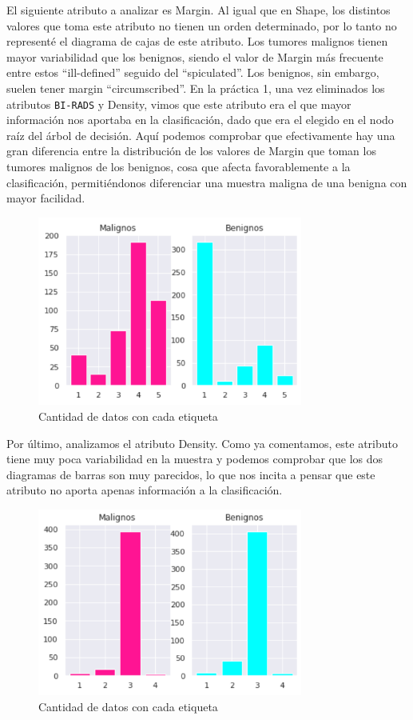 \documentclass[a4]{article}
\begin{document}
El siguiente atributo a analizar es Margin. Al igual que en Shape, los distintos valores que toma este atributo no tienen un orden determinado, por lo tanto no representé el diagrama de cajas de este atributo. Los tumores malignos tienen mayor variabilidad que los benignos, siendo el valor de Margin más frecuente entre estos ``ill-defined'' seguido del ``spiculated''. Los benignos, sin embargo, suelen tener margin ``circumscribed''. En la práctica 1, una vez eliminados los atributos \texttt{BI-RADS} y Density, vimos que este atributo era el que mayor información nos aportaba en la clasificación, dado que era el elegido en el nodo raíz del árbol de decisión. Aquí podemos comprobar que efectivamente hay una gran diferencia entre la distribución de los valores de Margin que toman los tumores malignos de los benignos, cosa que afecta favorablemente a la clasificación, permitiéndonos diferenciar una muestra maligna de una benigna con mayor facilidad.

\begin{figure}[H]
  \centering
  \caption{Cantidad de datos con cada etiqueta}
  \includegraphics[width=87mm]{imagenes/margin}
\end{figure}

Por último, analizamos el atributo Density. Como ya comentamos, este atributo tiene muy poca variabilidad en la muestra y podemos comprobar que los dos diagramas de barras son muy parecidos, lo que nos incita a pensar que este atributo no aporta apenas información a la clasificación.

\begin{figure}[H]
  \centering
  \caption{Cantidad de datos con cada etiqueta}
  \includegraphics[width=87mm]{imagenes/density}
\end{figure}
\end{document}
